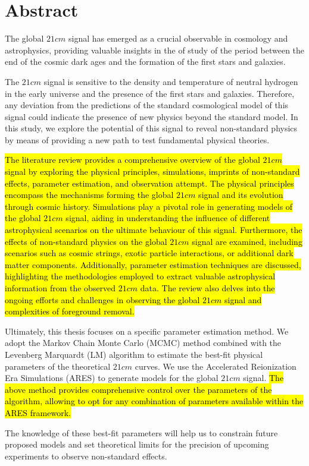 \documentclass[12pt, TexShade, letterpaper]{report}
\begin{document}
\chapter*{Abstract}
	\label{chap:engAbstract}
The global $21cm$ signal has emerged as a crucial observable in cosmology and astrophysics, providing valuable insights in the of study of the period between the end of the cosmic dark ages and the formation of the first stars and galaxies.\par
The $21cm$ signal is sensitive to the density and temperature of neutral hydrogen in the early universe and the presence of the first stars and galaxies. Therefore, any deviation from the predictions of the standard cosmological model of this signal could indicate the presence of new physics beyond the standard model. In this study, we explore the potential of this signal to reveal non-standard physics by means of providing a new path to test fundamental physical theories. \par
\hl{The literature review provides a comprehensive overview of the global $21cm$ signal by exploring the physical principles, simulations, imprints of non-standard effects, parameter estimation, and observation attempt. The physical principles encompass the mechanisms forming the global $21cm$ signal and its evolution through cosmic history. Simulations play a pivotal role in generating models of the global $21cm$ signal, aiding in understanding the influence of different astrophysical scenarios on the ultimate behaviour of this signal. Furthermore, the effects of non-standard physics on the global $21cm$ signal are examined, including scenarios such as cosmic strings, exotic particle interactions, or additional dark matter components. Additionally, parameter estimation techniques are discussed, highlighting the methodologies employed to extract valuable astrophysical information from the observed $21cm$ data. The review also delves into the ongoing efforts and challenges in observing the global $21cm$ signal and complexities of foreground removal.}\par
Ultimately, this thesis focuses on a specific parameter estimation method. We adopt the Markov Chain Monte Carlo (MCMC) method combined with the Levenberg Marquardt (LM) algorithm to estimate the best-fit physical parameters of the theoretical $21cm$ curves. We use the Accelerated Reionization Era Simulations (ARES) to generate models for the global $21cm$ signal. \hl{The above method provides comprehensive control over the parameters of the algorithm, allowing to opt for any combination of parameters available within the ARES framework.}\par
The knowledge of these best-fit parameters will help us to constrain future proposed models and set theoretical limits for the precision of upcoming experiments to observe non-standard effects.\par
\end{document}

